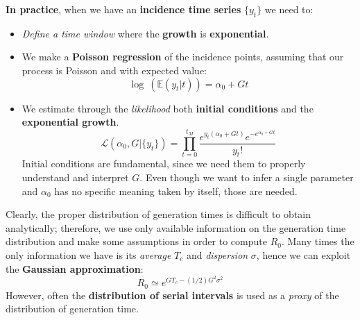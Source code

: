 \documentclass[../main/main.tex]{subfiles}
\begin{document}
\textbf{In practice}, when we have an \textbf{incidence time series} $\{ y_t \}$ we need to:
\begin{itemize}
    \item \textit{Define a time window} where the \textbf{growth} is \textbf{exponential}.
    \item We make a \textbf{Poisson regression} of the incidence points, assuming that our process is Poisson and with expected value:
    \begin{equation*}
        \log\ (\mathbb{E}(y_t|t)) = \alpha_0 + Gt
    \end{equation*}
    \item We estimate through the \textit{likelihood} both \textbf{initial conditions} and the \textbf{exponential growth}.
    \begin{equation*}
        \mathcal{L}(\alpha_0, G|\{y_t\}) = \prod_{t=0}^{t_M}\frac{e^{y_t(\alpha_0 + Gt)}e^{-e^{\alpha_0 + Gt}}}{y_t !}
    \end{equation*}
    Initial conditions are fundamental, since we need them to properly understand and interpret $G$. Even though we want to infer a single parameter and $\alpha_0$ has no specific meaning taken by itself, those are needed.
\end{itemize}

Clearly, the proper distribution of generation times is difficult to obtain analytically; therefore, we use only available information on the generation time distribution and make some assumptions in order to compute $R_0$.
Many times the only information we have is its \textit{average} $T_c$ and \textit{dispersion} $\sigma$, hence we can exploit the \textbf{Gaussian approximation}:
\begin{equation*}
    R_0 \simeq e^{GT_c-(1/2)G^2 \sigma^2}
\end{equation*}
However, often the \textbf{distribution of serial intervals} is used as a \textit{proxy} of the distribution of generation time.
\end{document}
